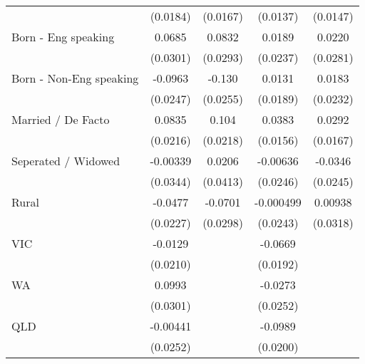 {\begin{tabular}{l*{4}{c}}
                    &    (0.0184)         &    (0.0167)         &    (0.0137)         &    (0.0147)         \\
[1em]
Born - Eng speaking &      0.0685\sym{*}  &      0.0832\sym{**} &      0.0189         &      0.0220         \\
                    &    (0.0301)         &    (0.0293)         &    (0.0237)         &    (0.0281)         \\
[1em]
Born - Non-Eng speaking&     -0.0963\sym{***}&      -0.130\sym{***}&      0.0131         &      0.0183         \\
                    &    (0.0247)         &    (0.0255)         &    (0.0189)         &    (0.0232)         \\
[1em]
Married / De Facto  &      0.0835\sym{***}&       0.104\sym{***}&      0.0383\sym{*}  &      0.0292         \\
                    &    (0.0216)         &    (0.0218)         &    (0.0156)         &    (0.0167)         \\
[1em]
Seperated / Widowed &    -0.00339         &      0.0206         &    -0.00636         &     -0.0346         \\
                    &    (0.0344)         &    (0.0413)         &    (0.0246)         &    (0.0245)         \\
[1em]
Rural               &     -0.0477\sym{*}  &     -0.0701\sym{*}  &   -0.000499         &     0.00938         \\
                    &    (0.0227)         &    (0.0298)         &    (0.0243)         &    (0.0318)         \\
[1em]
VIC                 &     -0.0129         &                     &     -0.0669\sym{***}&                     \\
                    &    (0.0210)         &                     &    (0.0192)         &                     \\
[1em]
WA                  &      0.0993\sym{***}&                     &     -0.0273         &                     \\
                    &    (0.0301)         &                     &    (0.0252)         &                     \\
[1em]
QLD                 &    -0.00441         &                     &     -0.0989\sym{***}&                     \\
                    &    (0.0252)         &                     &    (0.0200)         &                     \\

\end{tabular}}
